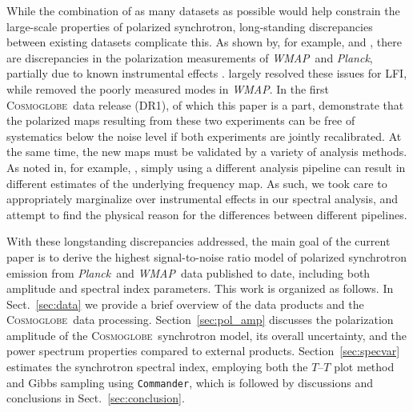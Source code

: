 \documentclass[twocolumn]{../../common/aa}
\def\WMAP{\emph{WMAP}}
\def\Planck{\emph{Planck}}
\def\commander{\texttt{Commander}}
\newcommand{\cosmoglobe}{\textsc{Cosmoglobe}}
\begin{document}
While the combination of as many datasets as possible would help constrain the large-scale properties of polarized synchrotron, long-standing discrepancies between existing datasets complicate this. As shown by, for example, \citet{planck2014-a12} and \citet{weiland:2018}, there are discrepancies in the polarization measurements of \WMAP\ and \Planck, partially due to known instrumental effects \citep{bennett2012,planck2016-l02}. \citet{bp01} largely resolved these issues for LFI, while \citet{bp17} removed the poorly measured modes in \WMAP. In the first \cosmoglobe\ data release (DR1), of which this paper is a part, \citet{watts2023_dr1} demonstrate that the polarized maps resulting from these two experiments can be free of  systematics below the noise level if both experiments are jointly recalibrated. At the same time, the new maps must be validated by a variety of analysis methods. As noted in, for example, \citet{weiland:2022}, simply using a different analysis pipeline can result in different estimates of the underlying frequency map. As such, we took care to appropriately marginalize over instrumental effects in our spectral analysis, and attempt to find the physical reason for the differences between different pipelines.

With these longstanding discrepancies addressed, the main goal of the current paper is to derive the highest signal-to-noise ratio model of polarized synchrotron emission from \Planck\ and \WMAP\ data published to date, including both amplitude and spectral index parameters. This work is organized as follows. In Sect.~\ref{sec:data} we provide a brief overview of the data products and the \cosmoglobe\ data processing. Section~\ref{sec:pol_amp} discusses the polarization amplitude of the \cosmoglobe\ synchrotron model, its overall uncertainty, and the power spectrum properties compared to external products. Section~\ref{sec:specvar} estimates the synchrotron spectral index, employing both the $T$--$T$ plot method and Gibbs sampling using \commander, which is followed by discussions and conclusions in Sect.~\ref{sec:conclusion}.


\end{document}
